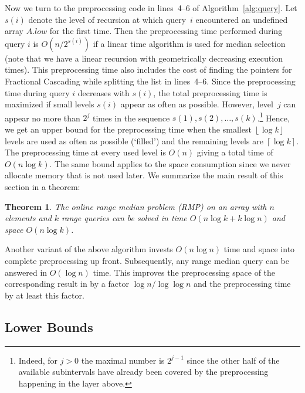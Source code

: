 \documentclass[a4paper,10pt]{article}
\newtheorem{theorem}{Theorem}
\newcommand{\ceil}[1]{\left\lceil #1\right\rceil}
\newcommand{\floor}[1]{\left\lfloor #1\right\rfloor}
\begin{document}
Now we turn to the preprocessing code in lines~4--6 of
Algorithm~\ref{alg:query}.  Let $s(i)$ denote the level of recursion
at which query~$i$ encountered an undefined array $A.low$ for the
first time. Then the preprocessing time performed during query $i$ is
$O(n/2^{s(i)})$ if a linear time algorithm is used for median
selection \cite{DBLP:conf/stoc/BlumFPRT72} (note that we have a linear
recursion with geometrically decreasing execution times).
This preprocessing time also includes the cost of 
finding the pointers for Fractional Cascading while splitting the list in lines~4--6.
Since the preprocessing time during query $i$
decreases with $s(i)$, the total preprocessing time is maximized if
small levels $s(i)$ appear as often as possible.  However, level~$j$
can appear no more than $2^j$ times in the
sequence $s(1),s(2),\ldots, s(k)$.\footnote{Indeed, for $j>0$ the maximal number is $2^{j-1}$ since the other half of the available subintervals have already been covered by the preprocessing happening in the layer above.}  Hence,
we get an upper bound for the preprocessing time when the smallest $\floor{\log k}$
levels are used as often as possible (`filled') and the remaining
levels are $\ceil{\log k}$.  The preprocessing time at every used
level is $O(n)$ giving a total time of $O(n\log k)$. The same bound
applies to the space consumption since we never allocate memory that
is not used later.
We summarize the main result of this section in a theorem:
\begin{theorem}
  The online range median problem (RMP) on an array with $n$ elements
  and $k$ range queries can be solved in time $O(n\log k + k\log n)$  and
  space $O(n\log k)$.
\end{theorem}


Another variant of the above algorithm invests $O(n\log n)$ time and space
into complete preprocessing up front. Subsequently,  any range median query can be answered in $O(\log n)$ time.
This improves the preprocessing
space of the corresponding result in \cite{DBLP:journals/njc/KrizancMS05} by a factor $\log n/\log\log n$ and the preprocessing time by at least this factor.


\subsection{Lower Bounds}
\label{ss:lowerbound}
\end{document}
